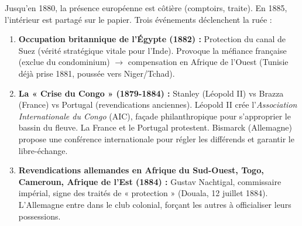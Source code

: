\documentclass[11pt]{article}
\begin{document}
Jusqu'en 1880, la présence européenne est côtière (comptoirs, traite). En 1885, l'intérieur est partagé sur le papier. Trois événements déclenchent la ruée :

\begin{exemplebox}
\begin{enumerate}
    \item \textbf{Occupation britannique de l'Égypte (1882) :} Protection du canal de Suez (vérité stratégique vitale pour l'Inde). Provoque la méfiance française (exclue du condominium) $\rightarrow$ compensation en Afrique de l'Ouest (Tunisie déjà prise 1881, poussée vers Niger/Tchad).
    \item \textbf{La « Crise du Congo » (1879-1884) :} Stanley (Léopold II) vs Brazza (France) vs Portugal (revendications anciennes). Léopold II crée l'\emph{Association Internationale du Congo} (AIC), façade philanthropique pour s'approprier le bassin du fleuve. La France et le Portugal protestent. Bismarck (Allemagne) propose une conférence internationale pour régler les différends et garantir le libre-échange.
    \item \textbf{Revendications allemandes en Afrique du Sud-Ouest, Togo, Cameroun, Afrique de l'Est (1884) :} Gustav Nachtigal, commissaire impérial, signe des traités de « protection » (Douala, 12 juillet 1884). L'Allemagne entre dans le club colonial, forçant les autres à officialiser leurs possessions.
\end{enumerate}
\end{exemplebox}
\end{document}
